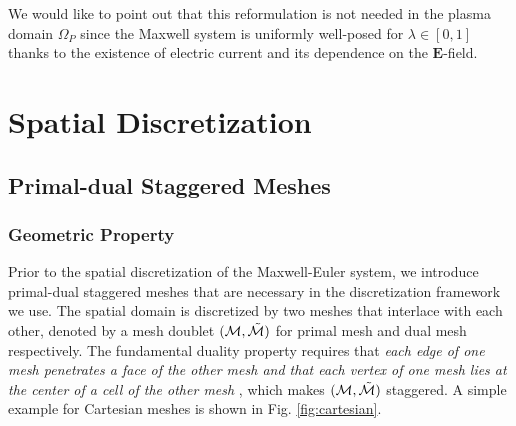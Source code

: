 \documentclass{article}
\begin{document}
We would like to point out that this reformulation is not needed in the plasma domain $\Omega_P$ since the Maxwell system is uniformly well-posed for $\lambda \in [0,1]$ thanks to the existence of electric current and its dependence on the $\mathbf{E}$-field. 

\section{Spatial Discretization} \label{sec:spatial_discretization}
\subsection{Primal-dual Staggered Meshes}
\subsubsection{Geometric Property}
Prior to the spatial discretization of the Maxwell-Euler system, we introduce primal-dual staggered meshes that are necessary in the discretization framework we use. The spatial domain is discretized by two meshes that interlace with each other, denoted by a mesh doublet $(\mathcal{M}, \Tilde{\mathcal{M}})$ for primal mesh and dual mesh respectively. The fundamental duality property requires that \emph{each edge of one mesh penetrates a face of the other mesh and that each vertex of one mesh lies at the center of a cell of the other mesh} \citep{weiland_2003}, which makes $(\mathcal{M}, \Tilde{\mathcal{M}})$ staggered. A simple example for Cartesian meshes is shown in Fig. \ref{fig:cartesian}.
\end{document}

